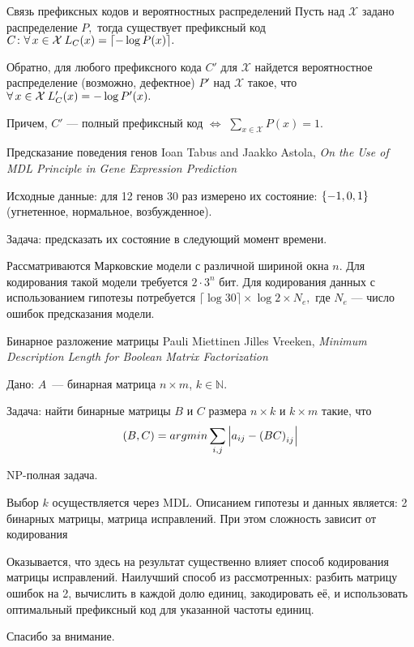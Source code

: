 \documentclass[unicode,lefteqn,c,hyperref={pdfpagelabels=true}]{beamer}
\begin{document}
\begin{frame}
	\begin{block}{Связь префиксных кодов и вероятностных распределений}
	Пусть над $\mathcal X$ задано распределение $P,$ тогда существует префиксный код $C \colon \forall\,x\in \mathcal X\: L_C(x) = \lceil-\log P(x)\rceil.$
	
	Обратно,  для любого префиксного кода $C'$ для $\mathcal X$ найдется вероятностное распределение (возможно, дефектное) $P'$ над $\mathcal{X}$ такое, что $\forall\,x\in \mathcal X\: L_C'(x) = -\log P'(x).$

	Причем, $C'$ --- полный префиксный код $\Leftrightarrow$ $\sum_{x\in \mathcal X} P(x) = 1.$
	\end{block}

\end{frame}

\begin{frame}{Предсказание поведения генов}
Ioan Tabus and Jaakko Astola, \textit{On the Use of MDL Principle in Gene Expression Prediction}

	Исходные данные: для 12 генов 30 раз измерено их состояние: $\left\{-1,0,1\right\}$ (угнетенное, нормальное, возбужденное). 

	Задача: предсказать их состояние в следующий момент времени.

	Рассматриваются Марковские модели с различной шириной окна $n$. Для кодирования такой модели требуется $2\cdot3^n$ бит.
	Для кодирования данных с использованием гипотезы потребуется $\lceil \log30\rceil \times \log2 \times N_e,$ где $N_e$ --- число ошибок предсказания модели.
\end{frame}

\begin{frame}{Бинарное разложение матрицы}
	Pauli Miettinen Jilles Vreeken, \textit{Minimum Description Length for Boolean Matrix Factorization}

	Дано: $A$~--- бинарная матрица $n\times m$, $k \in \mathbb N.$

	Задача: найти бинарные матрицы $B$ и $C$ размера $n\times k$ и $k\times m$ такие, что 
	$$(B,C) = \mathop{arg\,\!min}\limits\sum_{i,j}\left|a_{ij}-\left(BC\right)_{ij}\right|$$

	NP-полная задача.

	Выбор $k$ осуществляется через MDL. Описанием гипотезы и данных является: 2 бинарных матрицы, матрица исправлений. При этом сложность зависит от кодирования

	Оказывается, что здесь на результат существенно влияет способ кодирования матрицы исправлений. Наилучший способ из рассмотренных: 
	разбить матрицу ошибок на 2, вычислить в каждой долю единиц, закодировать её, и использовать оптимальный префиксный код для указанной частоты единиц.
\end{frame}

\begin{frame}{}
	 \begin{center}
	 {\LARGE Спасибо за внимание.}
	 \end{center}
\end{frame}
\end{document}
